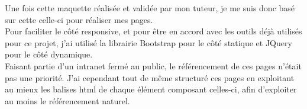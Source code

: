Une fois cette maquette réalisée et validée par mon tuteur, je me suis donc basé sur cette celle-ci pour réaliser mes pages.\\

Pour faciliter le côté responsive, et pour être en accord avec les outils déjà utilisés pour ce projet, j’ai utilisé la librairie Bootstrap pour le côté statique et JQuery pour le côté dynamique. \\

Faisant partie d’un intranet fermé au public, le référencement de ces pages n’était pas une priorité. J’ai cependant tout de même structuré ces pages en exploitant au mieux les balises html de chaque élément composant celles-ci, afin d'exploiter au moins le référencement naturel.